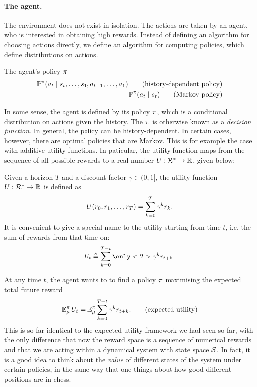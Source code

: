 \paragraph{The agent.}
The environment does not exist in isolation. The actions are taken by an agent, who is interested in obtaining high rewards. Instead of defining an algorithm for choosing actions directly, we define an algorithm for computing policies, which define distributions on actions.
\begin{block}{The agent's policy $\pi$}
  \begin{align}
    \Pr^\pol (a_t \mid s_t, \ldots, s_1, a_{t-1}, \ldots, a_1)\tag{history-dependent policy}
    \index{policy!history-dependent}
    \\
    \Pr^\pol (a_t \mid s_t) \tag{Markov policy}
    \index{policy!Markov}
  \end{align}
\end{block}

In some sense, the agent is defined by its \alert{policy} $\pi$,
which is a conditional distribution on actions given the history.
The  $\pi$ is otherwise known as a {\em decision
  function}. In general, the policy can be history-dependent. In
certain cases, however, there are optimal policies that are
Markov. This is for example the case with additive utility
functions.  In paticular, the utility function maps from the
sequence of all possible rewards to a real number $U : {\mathcal{R}}^* \to
{\mathbb{R}}$, given below:
\begin{definition}[Utility]
  Given a horizon $T$ and a discount factor $\gamma\in (0,1]$, the utility function $U : {\mathcal{R}}^* \to {\mathbb{R}}$ is defined as
  \begin{equation}
    \label{eq:tutility-vector}
    U(r_0, r_1, \ldots, r_T) = \sum_{k=0}^T \gamma^k r_k.
  \end{equation}
  It is convenient to give a special name to the utility starting from time $t$, i.e. the sum of rewards from that time on:
  \begin{equation}
    U_t \defn  \sum_{k=0}^{T-t} \only<2>{\disc^k} r_{t+k}.
  \end{equation}
\end{definition}
At any time $t$, the agent wants to to find a policy $\pi$ \alert{maximising}
the \alert{expected total future reward}
\begin{equation}
  \mathop{\mbox{\ensuremath{\mathbb{E}}}}\nolimits_{\mu}^{\pi} U_t = \mathop{\mbox{\ensuremath{\mathbb{E}}}}\nolimits_{\mu}^{\pi}
  \sum_{k=0}^{T-t} \gamma^k r_{t+k}. 
  \tag{expected utility}
\end{equation}
This is so far identical to the expected utility framework we had seen so far, with the only difference that now the reward space is a sequence of numerical rewards and that we are acting within a dynamical system with state space ${\mathcal{S}}$. In fact, it is a good idea to think about the \emph{value} of different states of the system under certain policies, in the same way that one things about how good different positions are in chess.


